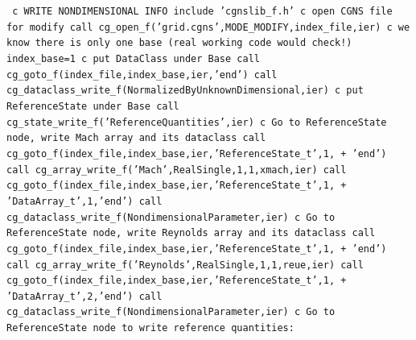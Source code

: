 \documentclass[12pt]{article}
\begin{document}
{\tt
\noindent c   WRITE NONDIMENSIONAL INFO
\newline\indent      include 'cgnslib\_f.h'
\newline c   open CGNS file for modify
\newline\indent      call cg\_open\_f('grid.cgns',MODE\_MODIFY,index\_file,ier)
\newline c   we know there is only one base (real working code would check!)
\newline\indent      index\_base=1
\newline c   put DataClass under Base
\newline\indent      call cg\_goto\_f(index\_file,index\_base,ier,'end')
\newline\indent      call cg\_dataclass\_write\_f(NormalizedByUnknownDimensional,ier)
\newline c   put ReferenceState under Base
\newline\indent      call cg\_state\_write\_f('ReferenceQuantities',ier)
\newline c   Go to ReferenceState node, write Mach array and its dataclass
\newline\indent      call cg\_goto\_f(index\_file,index\_base,ier,'ReferenceState\_t',1,
\newline + \indent  'end')
\newline\indent      call cg\_array\_write\_f('Mach',RealSingle,1,1,xmach,ier)
\newline\indent      call cg\_goto\_f(index\_file,index\_base,ier,'ReferenceState\_t',1,
\newline + \indent  'DataArray\_t',1,'end')
\newline\indent      call cg\_dataclass\_write\_f(NondimensionalParameter,ier)
\newline c   Go to ReferenceState node, write Reynolds array and its dataclass
\newline\indent      call cg\_goto\_f(index\_file,index\_base,ier,'ReferenceState\_t',1,
\newline + \indent  'end')
\newline\indent      call cg\_array\_write\_f('Reynolds',RealSingle,1,1,reue,ier)
\newline\indent      call cg\_goto\_f(index\_file,index\_base,ier,'ReferenceState\_t',1,
\newline + \indent  'DataArray\_t',2,'end')
\newline\indent      call cg\_dataclass\_write\_f(NondimensionalParameter,ier)
\newline c   Go to ReferenceState node to write reference quantities:
}
\end{document}
